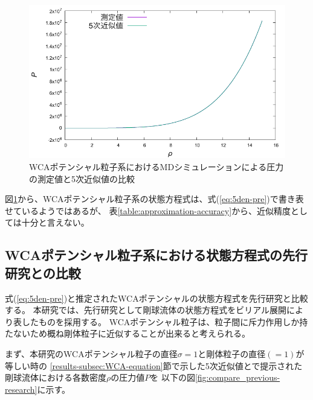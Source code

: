 \documentclass[titlepage]{jsreport}
\begin{document}
{{{\begin{figure}[htbp]
    \begin{center}
        \includegraphics[width=14cm]{fig/5den-pre.pdf}
    \end{center}
    \caption{WCAポテンシャル粒子系におけるMDシミュレーションによる圧力の測定値と5次近似値の比較}
    \label{fig:5den-pre}
\end{figure}

\newpage
図\ref{fig:5den-pre}から、WCAポテンシャル粒子系の状態方程式は、式(\ref{eq:5den-pre})で書き表せているようではあるが、
表\ref{table:approximation-accuracy}から、近似精度としては十分と言えない。

\subsection{WCAポテンシャル粒子系における状態方程式の先行研究との比較}\label{results-subsec:previous-research}
式(\ref{eq:5den-pre})と推定されたWCAポテンシャルの状態方程式を先行研究と比較する。
本研究では、先行研究として剛球流体の状態方程式をビリアル展開により表したものを採用する\cite{hard-sphere}。
WCAポテンシャル粒子は、粒子間に斥力作用しか持たないため概ね剛体粒子に近似することが出来ると考えられる。

まず、本研究のWCAポテンシャル粒子の直径$\sigma=1$と剛体粒子の直径$(=1)$が等しい時の
\ref{results-subsec:WCA-equation}節で示した5次近似値と\cite{hard-sphere}で提示された剛球流体における各数密度$\rho$の圧力値$P$を
以下の図\ref{fig:compare_previous-research}に示す。

}}}
\end{document}

